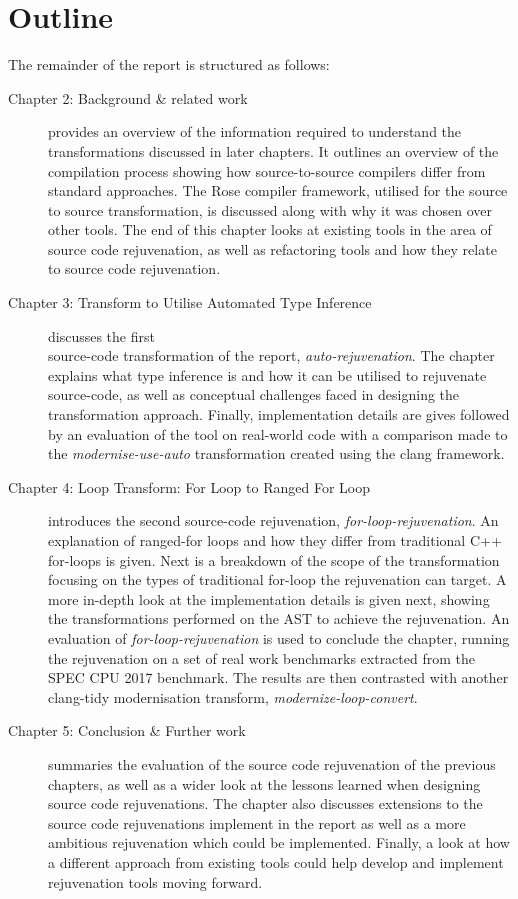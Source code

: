 \documentclass[bsc,frontabs,singlespacing,twoside,parskip,deptreport]{infthesis}
\begin{document}
\section{Outline}
The remainder of the report is structured as follows:
\begin{description}
    \item [Chapter 2: Background \& related work] provides an overview of the information required to understand the transformations discussed in later chapters. It outlines an overview of the compilation process showing how source-to-source compilers differ from standard approaches. The Rose compiler framework, utilised for the source to source transformation, is discussed along with why it was chosen over other tools. The end of this chapter looks at existing tools in the area of source code rejuvenation, as well as refactoring tools and how they relate to source code rejuvenation.
    
    \item [Chapter 3: Transform to Utilise Automated Type Inference] discusses the first \\source-code transformation of the report, \textit{auto-rejuvenation}. The chapter explains what type inference is and how it can be utilised to rejuvenate source-code, as well as conceptual challenges faced in designing the transformation approach. Finally, implementation details are gives followed by an evaluation of the tool on real-world code with a comparison made to the \textit{modernise-use-auto} transformation created using the clang framework. 
    
    \item [Chapter 4: Loop Transform: For Loop to Ranged For Loop] introduces the second source-code rejuvenation, \textit{for-loop-rejuvenation}. An explanation of ranged-for loops and how they differ from traditional C++ for-loops is given. Next is a breakdown of the scope of the transformation focusing on the types of traditional for-loop the rejuvenation can target. A more in-depth look at the implementation details is given next, showing the transformations performed on the AST to achieve the rejuvenation. An evaluation of \textit{for-loop-rejuvenation} is used to conclude the chapter, running the rejuvenation on a set of real work benchmarks extracted from the SPEC CPU 2017 benchmark. The results are then contrasted with another clang-tidy modernisation transform, \textit{modernize-loop-convert}. 
    
    \item [Chapter 5: Conclusion \& Further work] summaries the evaluation of the source code rejuvenation of the previous chapters, as well as a wider look at the lessons learned when designing source code rejuvenations. The chapter also discusses extensions to the source code rejuvenations implement in the report as well as a more ambitious rejuvenation which could be implemented. Finally, a look at how a different approach from existing tools could help develop and implement rejuvenation tools moving forward.
    
\end{description}
 
\end{document}
